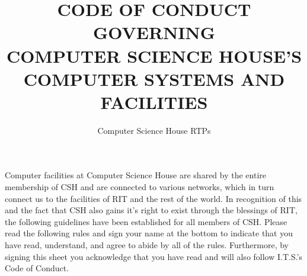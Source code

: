 \documentclass{article}
\title{
CODE OF CONDUCT GOVERNING\\
\textbf{COMPUTER SCIENCE HOUSE'S}\\
COMPUTER SYSTEMS AND FACILITIES}
\author{Computer Science House RTPs}
\date{\datechanged}
\begin{document}
\maketitle

Computer facilities at Computer Science House are shared by the entire
membership of CSH and are connected to various networks, which in turn connect
us to the facilities of RIT and the rest of the world. In recognition of this
and the fact that CSH also gains it's right to exist through the blessings of
RIT, the following guidelines have been established for all members of CSH.
Please read the following rules and sign your name at the bottom to indicate
that you have read, understand, and agree to abide by all of the rules.
Furthermore, by signing this sheet you acknowledge that you have read and will
also follow I.T.S.'s Code of Conduct.
\end{document}
